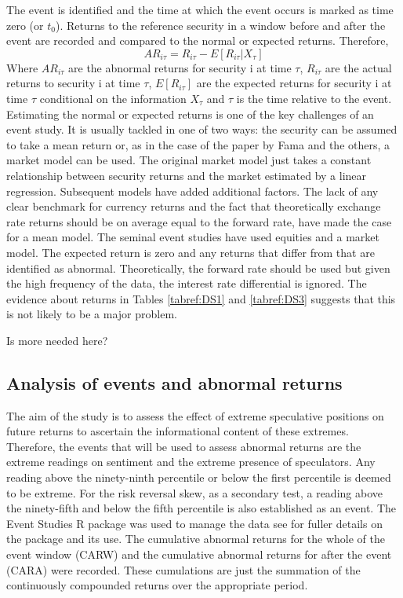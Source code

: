 \documentclass[12pt, a4paper, oneside]{article} %
\begin{document}
The event is identified and the time at which the event occurs is marked as time zero (or $t_0$).  Returns to the reference security in a window before and after the event are recorded and compared to the normal or expected returns.  Therefore, 
\begin{equation}
AR_{i \tau} = R_{i \tau} - E[R_{i \tau} | X_{\tau}]
\end{equation}
Where $AR_{i \tau}$ are the abnormal returns for security i at time $\tau$, $R_{i \tau}$ are the actual returns to security i at time $\tau$,  $E[R_{i \tau}]$ are the expected returns for security i at time $\tau$ conditional on the information $X_{\tau}$ and $\tau$ is the time relative to the event.  Estimating the normal or expected returns is one of the key challenges of an event  study.  It is usually tackled in one of two ways:  the security can be assumed to take a mean return or, as in the case of the paper by Fama and the others, a market model can be used.  The original market model just takes a constant relationship between security returns and the market estimated by a linear regression.  Subsequent models have added additional factors.   
The lack of any clear benchmark for currency returns and the fact that theoretically exchange rate returns should be on average equal to the forward rate, have made the case for a mean model.  The seminal event studies have used equities and a market model.  The expected return is zero and any returns that differ from that are identified as abnormal. Theoretically, the forward rate should be used but given the high frequency of the data, the interest rate differential is ignored.   The evidence about returns in Tables \ref{tabref:DS1} and \ref{tabref:DS3} suggests that this is not likely to be a major problem.    

Is more needed here? 

\subsection{Analysis of events and abnormal returns}
The aim of the study is to assess the effect of extreme speculative positions on future returns to ascertain the informational content of these extremes.  Therefore, the events that will be used to assess abnormal returns are the extreme readings on sentiment and the extreme presence of speculators.   Any reading above the ninety-ninth percentile or below the first percentile is deemed to be extreme.  For the risk reversal skew, as a secondary test, a reading above the ninety-fifth and below the fifth percentile is also established as an event.   The Event Studies R package was used to manage the data see \citep{eventstudies} for fuller details on the package and its use.  The cumulative abnormal returns for the whole of the event window (CARW) and the cumulative abnormal returns for after the event (CARA) were recorded.  These cumulations are just the summation of the continuously compounded returns over the appropriate period. 
\end{document}
